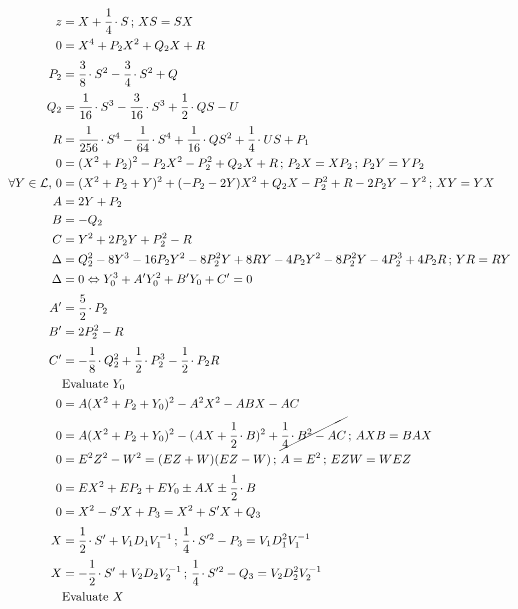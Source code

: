 \documentclass[12pt]{article}
\begin{document}
\begin{align}
  z &= X + \cfrac{1}{4}\cdot S\,;\,XS = SX \\
  0 &= X^4 + P_2 X^2 + Q_2 X + R \\
  P_2 &= \cfrac{3}{8}\cdot S^2 - \cfrac{3}{4}\cdot  S^2 + Q \\
  Q_2 &= \cfrac{1}{16}\cdot  S^3 - \cfrac{3}{16}\cdot  S^3 + \cfrac{1}{2}\cdot  QS - U \\
  R &= \cfrac{1}{256}\cdot  S^4 - \cfrac{1}{64}\cdot  S^4 + \cfrac{1}{16}\cdot  QS^2 + \cfrac{1}{4}\cdot  US + P_1 \\
  0 &= (X^2 + P_2)^2 - P_2 X^2 - P_2^2 + Q_2 X + R\,;\,P_2 X = X P_2\,;\,P_2 Y = Y P_2 \\
  \forall Y \in \mathcal{L},\,0 &= (X^2 + P_2 + Y)^2 + ( - P_2 - 2Y) X^2 + Q_2 X - P_2^2 + R - 2 P_2 Y - Y^2\,;\,XY = YX \\
  A &= 2 Y + P_2 \\
  B &= - Q_2 \\
  C &= Y^2 + 2 P_2 Y + P_2^2 - R \\
  \Delta &= Q_2^2 - 8 Y^3 - 16 P_2 Y^2 - 8 P_2^2Y + 8RY - 4 P_2 Y^2 - 8 P_2^2 Y - 4 P_2^3 + 4 P_2 R\,;\,YR = RY \\
  \Delta &= 0 \Leftrightarrow Y_0^3 + A' Y_0^2 + B' Y_0 + C' = 0 \\
  A' &= \cfrac{5}{2}\cdot P_2 \\
  B' &= 2 P_2^2 - R \\
  C' &= -\cfrac{1}{8}\cdot Q_2^2 + \cfrac{1}{2}\cdot P_2^3 - \cfrac{1}{2}\cdot P_2 R \\
  &\text{Evaluate }Y_0 \\
  0 &= A (X^2 + P_2 + Y_0)^2 - A^2 X^2 - ABX - AC \\
  0 &= A (X^2 + P_2 + Y_0)^2 - (AX + \cfrac{1}{2}\cdot B)^2 + \cancel{\cfrac{1}{4}\cdot B^2 - AC}\,;\,AXB = BAX \\
  0 &= E^2 Z^2 - W^2 = (EZ + W)(EZ - W)\,;\,A = E^2\,;\,EZW = WEZ \\
  0 &= E X^2 + E P_2 + E Y_0 \pm AX \pm \cfrac{1}{2}\cdot B \\
  0 &= X^2 - S' X + P_3 = X^2 + S'X + Q_3 \\
  X &= \cfrac{1}{2}\cdot S' + V_1D_1V_1^{-1}\,;\,\cfrac{1}{4}\cdot S'^2 - P_3 = V_1D_1^2 V_1^{-1} \\
  X &= - \cfrac{1}{2}\cdot S' + V_2D_2V_2^{-1}\,;\,\cfrac{1}{4}\cdot S'^2 - Q_3 = V_2D_2^2 V_2^{-1} \\
  &\text{Evaluate }X 
\end{align}
\end{document}
